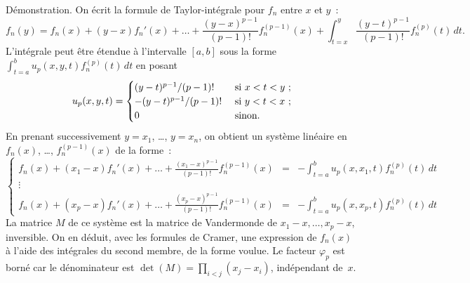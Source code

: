 {\begin{enumerate}
{    Démonstration. On écrit la formule de Taylor-intégrale pour $f_n$ entre
    $x$ et $y$~:
    $$f_n(y) = f_n(x) + (y-x)f_n'(x) + \dots + \frac{(y-x)^{p-1}}{(p-1)!}f_n^{(p-1)}(x)
             +  \int_{t=x}^y \frac{(y-t)^{p-1}}{(p-1)!}f_n^{(p)}(t)\,d t.$$
    L'intégrale peut être étendue à l'intervalle $[a,b]$ sous la forme
    $ \int_{t=a}^b u_p(x,y,t)f_n^{(p)}(t)\,d t$ en posant
    $$u_p(x,y,t) = \begin{cases}(y-t)^{p-1}/(p-1)!  & \text{ si } x < t < y~;\cr
                          -(y-t)^{p-1}/(p-1)! & \text{ si } y < t < x~;\cr
                          0                   & \text{ sinon}.\cr\end{cases}$$
    En prenant successivement $y=x_1$, \ldots, $y=x_n$, on obtient un
    système linéaire en $f_n(x)$, \dots, $f_n^{(p-1)}(x)$ de la forme~:
    $$\left\{\begin{array}{lll} f_n(x) + (x_1-x)f_n'(x) + \dots + \frac{(x_1-x)^{p-1}}{(p-1)!}f_n^{(p-1)}(x) &= &- \int_{t=a}^b u_p(x,x_1,t)f_n^{(p)}(t)\,d t\\[3pt]
             \vdots\\
             f_n(x) + (x_p-x)f_n'(x) + \dots + \frac{(x_p-x)^{p-1}}{(p-1)!}f_n^{(p-1)}(x) &= &- \int_{t=a}^b u_p(x,x_p,t)f_n^{(p)}(t)\,d t\end{array}\right.$$
    La matrice $M$ de ce système est la matrice de Vandermonde de $x_1-x,\dots,x_p-x$,
    inversible. On en déduit, avec les
    formules de Cramer, une expression de $f_n(x)$ à l'aide des intégrales du second membre,
    de la forme voulue. Le facteur $\varphi_p$ est borné car le dénominateur
    est $\det(M) = \prod_{i<j}(x_j-x_i)$, indépendant de~$x$.
}
\end{enumerate}
}
